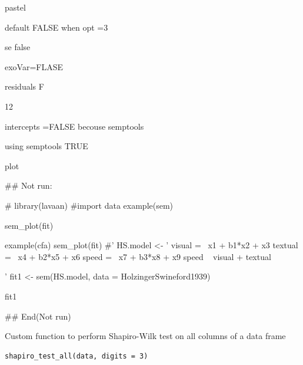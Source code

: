 \documentclass[a4paper]{book}
\begin{document}
\begin{Arguments}
\begin{ldescription}
\item[\code{pastel}] pastel

\item[\code{fade}] default FALSE when opt =3

\item[\code{se}] se false

\item[\code{exoVar}] exoVar=FLASE

\item[\code{residuals}] residuals F

\item[\code{residScale}] 12

\item[\code{intercepts}] intercepts =FALSE becouse semptools

\item[\code{semptools}] using semptools TRUE
\end{ldescription}
\end{Arguments}
%
\begin{Value}
plot
\end{Value}
%
\begin{Examples}
\begin{ExampleCode}

## Not run: 

# library(lavaan)
#import data
example(sem)

sem_plot(fit)

example(cfa)
sem_plot(fit)
#'
HS.model <- '
    visual  =~ x1 + b1*x2 + x3
    textual =~ x4 + b2*x5 + x6
    speed   =~ x7 + b3*x8 + x9
speed ~ visual + textual

'
fit1 <- sem(HS.model, data = HolzingerSwineford1939)

fit1 %

## End(Not run)
\end{ExampleCode}
\end{Examples}
%
\begin{Description}
Custom function to perform Shapiro-Wilk test on all columns of a data frame
\end{Description}
%
\begin{Usage}
\begin{verbatim}
shapiro_test_all(data, digits = 3)
\end{verbatim}
\end{Usage}
\end{document}
